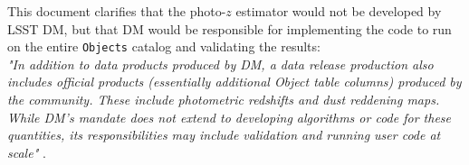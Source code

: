 \documentclass[DM,lsstdraft,toc]{lsstdoc}
\begin{document}
This document clarifies that the photo-$z$ estimator would not be developed by LSST DM, but that DM would be responsible for implementing the code to run on the entire {\tt Objects} catalog and validating the results: \\
{\it "In addition to data products produced by DM, a data release production also includes official
products (essentially additional Object table columns) produced by the community. These
include photometric redshifts and dust reddening maps. While DM's mandate does not extend
to developing algorithms or code for these quantities, its responsibilities may include validation
and running user code at scale"} .


\end{document}
